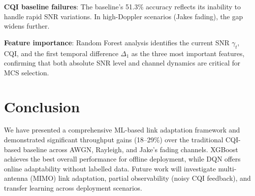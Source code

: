 \documentclass[conference]{IEEEtran}
\begin{document}
\textbf{CQI baseline failures}: The baseline's 51.3\% accuracy reflects its
inability to handle rapid SNR variations. In high-Doppler scenarios (Jakes
fading), the gap widens further.

\textbf{Feature importance}: Random Forest analysis identifies the current SNR
$\gamma_t$, CQI, and the first temporal difference $\Delta_1$ as the three
most important features, confirming that both absolute SNR level and channel
dynamics are critical for MCS selection.

\section{Conclusion}

We have presented a comprehensive ML-based link adaptation framework and
demonstrated significant throughput gains (18–29\%) over the traditional
CQI-based baseline across AWGN, Rayleigh, and Jake's fading channels. XGBoost
achieves the best overall performance for offline deployment, while DQN offers
online adaptability without labelled data. Future work will investigate
multi-antenna (MIMO) link adaptation, partial observability (noisy CQI
feedback), and transfer learning across deployment scenarios.



\end{document}
